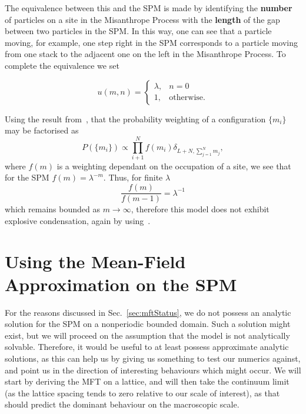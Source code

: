 The equivalence between this and the SPM is made by identifying the \textbf{number} of particles on a site in the Misanthrope Process with the \textbf{length} of the gap between two particles in the SPM. In this way, one can see that a particle
moving, for example, one step right in the SPM corresponds to a particle moving from one stack to the adjacent one on the left in the Misanthrope Process. To complete the equivalence we set


\[
  u(m, n) =
  \begin{cases}
                                   \lambda, & n=0 \\
                                   1, & \text{otherwise.} 
  \end{cases}
\]

Using the result from~\cite{evansWaclaw2014}, that the probability weighting of a configuration $\{m_i\}$ may be factorised as
\begin{equation}
 P(\{m_i\}) \propto \prod_{i+1}^N f(m_i) \delta_{L+N, \sum_{j=1}^N m_j},
\end{equation}
where $f(m)$ is a weighting dependant on the occupation of a site,  we see that for the SPM $f(m) = \lambda^{-m}$. Thus, for finite $\lambda$ 
\begin{equation}
 \frac{f(m)}{f(m-1)} = \lambda^{-1}
\end{equation}
which remains bounded as $m \rightarrow \infty$, therefore this model does not exhibit explosive condensation, again by using~\cite{evansWaclaw2014}.


\section{Using the Mean-Field Approximation on the SPM}
For the reasons discussed in Sec.~\ref{sec:mftStatus}, we do not possess an analytic solution for the SPM on a nonperiodic bounded domain. Such a solution might exist, but
we will proceed on the assumption that the model is not analytically solvable. Therefore, it would be useful to at least possess approximate analytic solutions, as this can help us by giving us
something to test our numerics against, and point us in the direction of interesting behaviours which might occur. We will start by deriving the MFT on a lattice, and will then take the continuum limit (as the lattice spacing tends to zero
relative to our scale of interest), as that should predict the dominant behaviour on the macroscopic scale.


